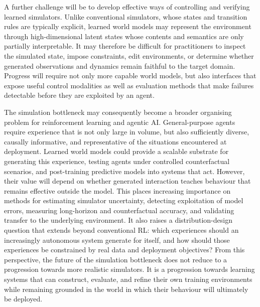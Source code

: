A further challenge will be to develop effective ways of controlling and verifying learned simulators. Unlike conventional simulators, whose states and transition rules are typically explicit, learned world models may represent the environment through high-dimensional latent states whose contents and semantics are only partially interpretable. It may therefore be difficult for practitioners to inspect the simulated state, impose constraints, edit environments, or determine whether generated observations and dynamics remain faithful to the target domain. Progress will require not only more capable world models, but also interfaces that expose useful control modalities as well as evaluation methods that make failures detectable before they are exploited by an agent.

The simulation bottleneck may consequently become a broader organising problem for reinforcement learning and agentic AI. General-purpose agents require experience that is not only large in volume, but also sufficiently diverse, causally informative, and representative of the situations encountered at deployment. Learned world models could provide a scalable substrate for generating this experience, testing agents under controlled counterfactual scenarios, and post-training predictive models into systems that act. However, their value will depend on whether generated interaction teaches behaviour that remains effective outside the model. This places increasing importance on methods for estimating simulator uncertainty, detecting exploitation of model errors, measuring long-horizon and counterfactual accuracy, and validating transfer to the underlying environment. It also raises a distribution-design question that extends beyond conventional RL: which experiences should an increasingly autonomous system generate for itself, and how should those experiences be constrained by real data and deployment objectives? From this perspective, the future of the simulation bottleneck does not reduce to a progression towards more realistic simulators. It is a progression towards learning systems that can construct, evaluate, and refine their own training environments while remaining grounded in the world in which their behaviour will ultimately be deployed.